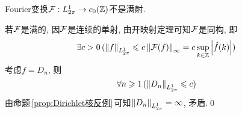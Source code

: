 \begin{Proposition}
	Fourier变换$ \mathcal{F} : L_{2\pi}^1\to c_0(\mathbb{Z}) $不是满射.
\end{Proposition}
\begin{Proof}
	若$ \mathcal{F} $是满的, 因$ \mathcal{F} $是连续的单射, 由开映射定理可知$ \mathcal{F} $是同构, 即
	\[
		\exists c>0\,(\left\| f \right\|_{L_{2\pi}^1}\leqslant c\left\| \mathcal{F}(f) \right\|_\infty=c\sup_{k\in\mathbb{Z}}\left| \hat{f}(k) \right| )
	\]
	考虑$ f=D_n $, 则
	\[
		\forall n\geqslant 1\,(\left\| D_n \right\|_{L_{2\pi}^1}\leqslant c)
	\]
	由命题\,\ref{prop:Dirichlet核反例}\,可知$ \left\| D_n \right\|_{L_{2\pi}^1}=\infty $, 矛盾.\qed
\end{Proof}
